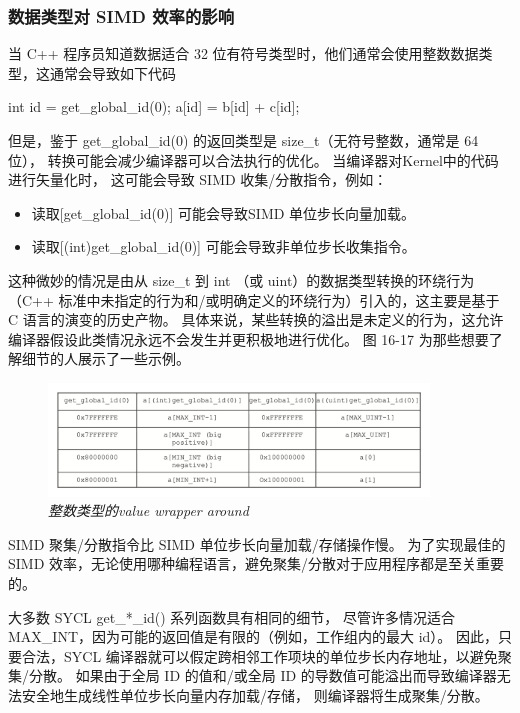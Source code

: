 \subsubsection{数据类型对 SIMD 效率的影响}
当 C++ 程序员知道数据适合 32 位有符号类型时，他们通常会使用整数数据类型，这通常会导致如下代码

int id = get\_global\_id(0); a[id] = b[id] + c[id];

但是，鉴于 get\_global\_id(0) 的返回类型是 size\_t（无符号整数，通常是 64 位），
转换可能会减少编译器可以合法执行的优化。 当编译器对Kernel中的代码进行矢量化时，
这可能会导致 SIMD 收集/分散指令，例如：

\begin{itemize}
	\item 读取[get\_global\_id(0)] 可能会导致SIMD 单位步长向量加载。

	\item 读取[(int)get\_global\_id(0)] 可能会导致非单位步长收集指令。
\end{itemize}

这种微妙的情况是由从 size\_t 到 int （或 uint）的数据类型转换的环绕行为
（C++ 标准中未指定的行为和/或明确定义的环绕行为）引入的，这主要是基于 C 语言的演变的历史产物。 
具体来说，某些转换的溢出是未定义的行为，这允许编译器假设此类情况永远不会发生并更积极地进行优化。 
图 16-17 为那些想要了解细节的人展示了一些示例。

\begin{figure}[H]
	\centering
	\includegraphics[width=0.9\textwidth]{figs/F16.17.png}
	\caption{\textit{整数类型的value wrapper around }}
\end{figure}

SIMD 聚集/分散指令比 SIMD 单位步长向量加载/存储操作慢。 
为了实现最佳的 SIMD 效率，无论使用哪种编程语言，避免聚集/分散对于应用程序都是至关重要的。

大多数 SYCL get\_*\_id() 系列函数具有相同的细节，
尽管许多情况适合 MAX\_INT，因为可能的返回值是有限的（例如，工作组内的最大 id）。 
因此，只要合法，SYCL 编译器就可以假定跨相邻工作项块的单位步长内存地址，以避免聚集/分散。 
如果由于全局 ID 的值和/或全局 ID 的导数值可能溢出而导致编译器无法安全地生成线性单位步长向量内存加载/存储，
则编译器将生成聚集/分散。

